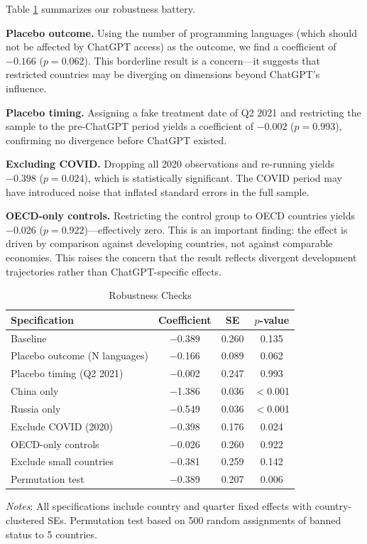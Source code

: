 \documentclass[12pt]{article}
\begin{document}
Table \ref{tab:robust} summarizes our robustness battery.

\textbf{Placebo outcome.} Using the number of programming languages (which should not be affected by ChatGPT access) as the outcome, we find a coefficient of $-0.166$ ($p = 0.062$). This borderline result is a concern---it suggests that restricted countries may be diverging on dimensions beyond ChatGPT's influence.

\textbf{Placebo timing.} Assigning a fake treatment date of Q2 2021 and restricting the sample to the pre-ChatGPT period yields a coefficient of $-0.002$ ($p = 0.993$), confirming no divergence before ChatGPT existed.

\textbf{Excluding COVID.} Dropping all 2020 observations and re-running yields $-0.398$ ($p = 0.024$), which is statistically significant. The COVID period may have introduced noise that inflated standard errors in the full sample.

\textbf{OECD-only controls.} Restricting the control group to OECD countries yields $-0.026$ ($p = 0.922$)---effectively zero. This is an important finding: the effect is driven by comparison against developing countries, not against comparable economies. This raises the concern that the result reflects divergent development trajectories rather than ChatGPT-specific effects.

\begin{table}[H]
\centering
\begin{threeparttable}
\caption{Robustness Checks}
\label{tab:robust}
\small
\begin{tabular}{lccc}
\toprule
Specification & Coefficient & SE & $p$-value \\
\midrule
Baseline & $-$0.389 & 0.260 & 0.135 \\
Placebo outcome (N languages) & $-$0.166 & 0.089 & 0.062 \\
Placebo timing (Q2 2021) & $-$0.002 & 0.247 & 0.993 \\
China only & $-$1.386 & 0.036 & $<$0.001 \\
Russia only & $-$0.549 & 0.036 & $<$0.001 \\
Exclude COVID (2020) & $-$0.398 & 0.176 & 0.024 \\
OECD-only controls & $-$0.026 & 0.260 & 0.922 \\
Exclude small countries & $-$0.381 & 0.259 & 0.142 \\
Permutation test & $-$0.389 & 0.207 & 0.006 \\
\bottomrule
\end{tabular}
\begin{tablenotes}
\small
\item \textit{Notes}: All specifications include country and quarter fixed effects with country-clustered SEs. Permutation test based on 500 random assignments of banned status to 5 countries.
\end{tablenotes}
\end{threeparttable}
\end{table}
\end{document}
